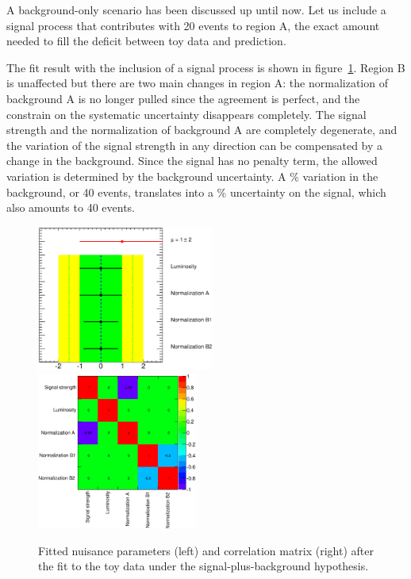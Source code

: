   A background-only scenario has been discussed up until now. Let us include a signal process that contributes with 20 events to region A, the exact amount needed to fill the deficit between toy data and prediction.

  The fit result with the inclusion of a signal process is shown in figure~\ref{fig:toy_resultSB}. Region B is unaffected but there are two main changes in region A: the normalization of background A is no longer pulled since the agreement is perfect, and the constrain on the systematic uncertainty disappears completely. The signal strength and the normalization of background A are completely degenerate, and the variation of the signal strength in any direction can be compensated by a change in the background. Since the signal has no penalty term, the allowed variation is determined by the background uncertainty. A \unit[50]{\%} variation in the background, or 40 events, translates into a \unit[200]{\%} uncertainty on the signal, which also amounts to 40 events.
   \begin{figure}[tb!]
     \centering
     \includegraphics[valign=t, width=0.52\textwidth]{Statistics/Figures/fitexample/toyFitSB.eps}
     \includegraphics[valign=t, width=0.47\textwidth]{Statistics/Figures/fitexample/toyCorrSB.eps}
     \caption{Fitted nuisance parameters (left) and correlation matrix (right) after the fit to the toy data under the signal-plus-background hypothesis. }
     \label{fig:toy_resultSB}
   \end{figure}

